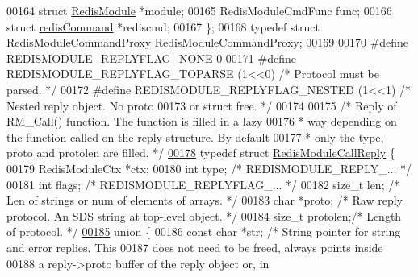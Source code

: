 \begin{DoxyCode}
00164     \textcolor{keyword}{struct} \hyperlink{structRedisModule}{RedisModule} *module;
00165     RedisModuleCmdFunc func;
00166     \textcolor{keyword}{struct} \hyperlink{structredisCommand}{redisCommand} *rediscmd;
00167 \};
00168 \textcolor{keyword}{typedef} \textcolor{keyword}{struct} \hyperlink{structRedisModuleCommandProxy}{RedisModuleCommandProxy} RedisModuleCommandProxy;
00169 
00170 \textcolor{preprocessor}{#}\textcolor{preprocessor}{define} \textcolor{preprocessor}{REDISMODULE\_REPLYFLAG\_NONE} 0
00171 \textcolor{preprocessor}{#}\textcolor{preprocessor}{define} \textcolor{preprocessor}{REDISMODULE\_REPLYFLAG\_TOPARSE} \textcolor{preprocessor}{(}1\textcolor{preprocessor}{<<}0\textcolor{preprocessor}{)} \textcolor{comment}{/* Protocol must be parsed. */}
00172 \textcolor{preprocessor}{#}\textcolor{preprocessor}{define} \textcolor{preprocessor}{REDISMODULE\_REPLYFLAG\_NESTED} \textcolor{preprocessor}{(}1\textcolor{preprocessor}{<<}1\textcolor{preprocessor}{)}  \textcolor{comment}{/* Nested reply object. No proto}
00173 \textcolor{comment}{                                                or struct free. */}
00174 
00175 \textcolor{comment}{/* Reply of RM\_Call() function. The function is filled in a lazy}
00176 \textcolor{comment}{ * way depending on the function called on the reply structure. By default}
00177 \textcolor{comment}{ * only the type, proto and protolen are filled. */}
\hyperlink{structRedisModuleCallReply}{00178} \textcolor{keyword}{typedef} \textcolor{keyword}{struct} \hyperlink{structRedisModuleCallReply}{RedisModuleCallReply} \{
00179     RedisModuleCtx *ctx;
00180     \textcolor{keywordtype}{int} type;       \textcolor{comment}{/* REDISMODULE\_REPLY\_... */}
00181     \textcolor{keywordtype}{int} flags;      \textcolor{comment}{/* REDISMODULE\_REPLYFLAG\_...  */}
00182     size\_t len;     \textcolor{comment}{/* Len of strings or num of elements of arrays. */}
00183     \textcolor{keywordtype}{char} *proto;    \textcolor{comment}{/* Raw reply protocol. An SDS string at top-level object. */}
00184     size\_t protolen;\textcolor{comment}{/* Length of protocol. */}
\hyperlink{unionRedisModuleCallReply_8val}{00185}     \textcolor{keyword}{union} \{
00186         \textcolor{keyword}{const} \textcolor{keywordtype}{char} *str; \textcolor{comment}{/* String pointer for string and error replies. This}
00187 \textcolor{comment}{                            does not need to be freed, always points inside}
00188 \textcolor{comment}{                            a reply->proto buffer of the reply object or, in}

\end{DoxyCode}
